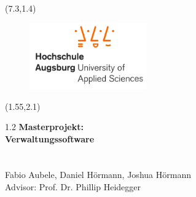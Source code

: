 
\textblockorigin{0mm}{0mm}

\thispagestyle{empty}\null
\begin{textblock}{10}(7.3,1.4)
\begin{figure}[h]
	\centering
		\includegraphics[width=0.45\textwidth]{figures/hsa_logo.pdf}
\end{figure}

\end{textblock}




\begin{textblock}{15}(1.55,2.1)
	\begin{flushleft}
		\begin{spacing} {1.2}
			\huge	
				\textbf{Masterprojekt:\\ Verwaltungssoftware \\}
				\vspace{-30pt}
				\textcolor[rgb]{1,0.4,0}{\\
				\textbf{}}\\
			\LARGE
				\vspace{450pt}
				Fabio Aubele, Daniel Hörmann, Joshua Hörmann  \\
				\vspace{60pt}		
			\LARGE
				Advisor: Prof. Dr. Phillip Heidegger\\
			\end{spacing}
		\end{flushleft}
		
\end{textblock}


\pagebreak
